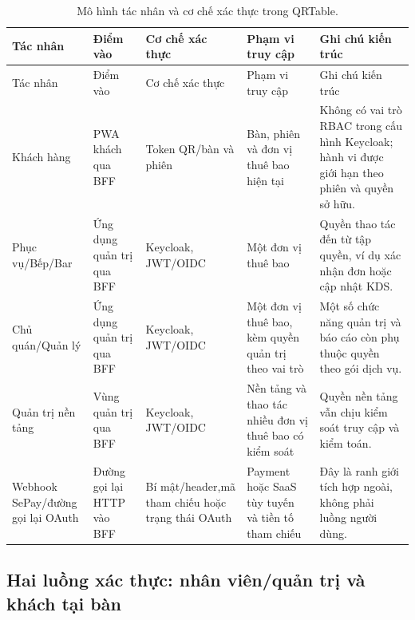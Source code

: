{\scriptsize
\setlength{\tabcolsep}{3pt}
\begin{longtable}{>{\raggedright\arraybackslash}p{}>{\raggedright\arraybackslash}p{}>{\raggedright\arraybackslash}p{}>{\raggedright\arraybackslash}p{}>{\raggedright\arraybackslash}p{}}
  \caption{Mô hình tác nhân và cơ chế xác thực trong QRTable.}
  \label{tab:chapter4-auth-actor-model}\\
  \toprule
  Tác nhân & Điểm vào & Cơ chế xác thực & Phạm vi truy cập & Ghi chú kiến trúc \\
  \midrule
  \endfirsthead
  \toprule
  Tác nhân & Điểm vào & Cơ chế xác thực & Phạm vi truy cập & Ghi chú kiến trúc \\
  \midrule
  \endhead
  Khách hàng & PWA khách qua BFF & Token QR/bàn và phiên & Bàn, phiên và đơn vị thuê bao hiện tại & Không có vai trò RBAC trong cấu hình Keycloak; hành vi được giới hạn theo phiên và quyền sở hữu. \\
  Phục vụ/\newline Bếp/\newline Bar & Ứng dụng quản trị qua BFF & Keycloak, JWT/OIDC & Một đơn vị thuê bao & Quyền thao tác đến từ tập quyền, ví dụ xác nhận đơn hoặc cập nhật KDS. \\
  Chủ quán/\newline Quản lý & Ứng dụng quản trị qua BFF & Keycloak, JWT/OIDC & Một đơn vị thuê bao, kèm quyền quản trị theo vai trò & Một số chức năng quản trị và báo cáo còn phụ thuộc quyền theo gói dịch vụ. \\
  Quản trị nền tảng & Vùng quản trị qua BFF & Keycloak, JWT/OIDC & Nền tảng và thao tác nhiều đơn vị thuê bao có kiểm soát & Quyền nền tảng vẫn chịu kiểm soát truy cập và kiểm toán. \\
  Webhook SePay/\newline đường gọi lại OAuth & Đường gọi lại HTTP vào BFF & Bí mật/header,\newline mã tham chiếu hoặc trạng thái OAuth & Payment hoặc SaaS tùy tuyến và tiền tố tham chiếu & Đây là ranh giới tích hợp ngoài, không phải luồng người dùng. \\
  \bottomrule
\end{longtable}
}

\subsection{Hai luồng xác thực: nhân viên/quản trị và khách tại bàn}

